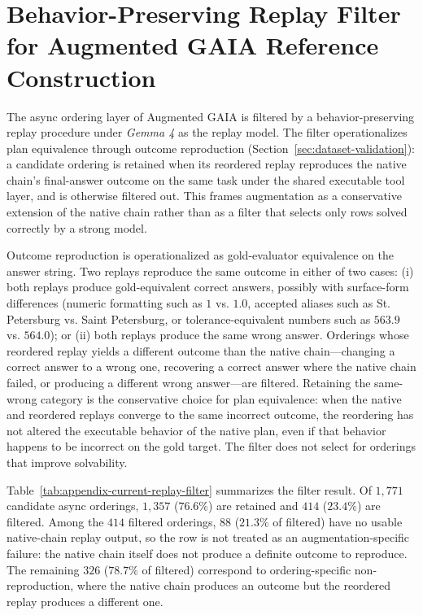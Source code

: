 \documentclass{article}
\providecommand{\model}[1]{\emph{#1}}
\begin{document}
\FloatBarrier
\clearpage


\section{Behavior-Preserving Replay Filter for Augmented GAIA Reference Construction}
\label{sec:appendix-replay-filter-current}

The async ordering layer of Augmented GAIA is filtered by a behavior-preserving replay procedure under \model{Gemma 4} as the replay model. The filter operationalizes plan equivalence through outcome reproduction (Section~\ref{sec:dataset-validation}): a candidate ordering is retained when its reordered replay reproduces the native chain's final-answer outcome on the same task under the shared executable tool layer, and is otherwise filtered out. This frames augmentation as a conservative extension of the native chain rather than as a filter that selects only rows solved correctly by a strong model.

Outcome reproduction is operationalized as gold-evaluator equivalence on the answer string. Two replays reproduce the same outcome in either of two cases: (i) both replays produce gold-equivalent correct answers, possibly with surface-form differences (numeric formatting such as $1$ vs. $1.0$, accepted aliases such as St. Petersburg vs. Saint Petersburg, or tolerance-equivalent numbers such as $563.9$ vs. $564.0$); or (ii) both replays produce the same wrong answer. Orderings whose reordered replay yields a different outcome than the native chain---changing a correct answer to a wrong one, recovering a correct answer where the native chain failed, or producing a different wrong answer---are filtered. Retaining the same-wrong category is the conservative choice for plan equivalence: when the native and reordered replays converge to the same incorrect outcome, the reordering has not altered the executable behavior of the native plan, even if that behavior happens to be incorrect on the gold target. The filter does not select for orderings that improve solvability.

Table~\ref{tab:appendix-current-replay-filter} summarizes the filter result. Of $1{,}771$ candidate async orderings, $1{,}357$ ($76.6\%$) are retained and $414$ ($23.4\%$) are filtered. Among the $414$ filtered orderings, $88$ ($21.3\%$ of filtered) have no usable native-chain replay output, so the row is not treated as an augmentation-specific failure: the native chain itself does not produce a definite outcome to reproduce. The remaining $326$ ($78.7\%$ of filtered) correspond to ordering-specific non-reproduction, where the native chain produces an outcome but the reordered replay produces a different one.
\end{document}
